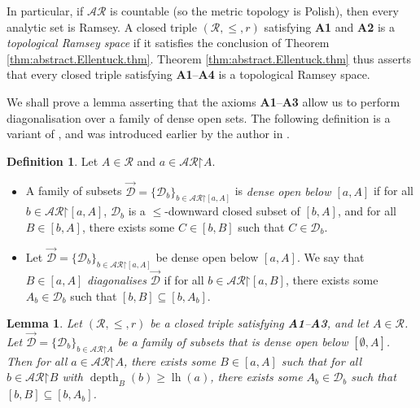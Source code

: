 \documentclass[10pt,a4paper]{amsart}
\theoremstyle{plain}
\numberwithin{equation}{section}
\newtheorem{lemma}[theorem]{Lemma}
\theoremstyle{definition}
\newtheorem{definition}[theorem]{Definition}
\newcommand{\func}{\operatorname}
\newcommand{\cal}{\mathcal}
\newcommand{\restrictedto}{\mathord{\upharpoonright}}
\newcommand{\lh}{\func{lh}}
\newcommand{\depth}{\func{depth}}
\newcommand{\D}{\cal{D}}
\begin{document}
In particular, if $\cal{AR}$ is countable (so the metric topology is Polish), then every analytic set is Ramsey. A closed triple $(\cal{R},\leq,r)$ satisfying \textbf{A1} and \textbf{A2} is a \emph{topological Ramsey space} if it satisfies the conclusion of Theorem \ref{thm:abstract.Ellentuck.thm}. Theorem \ref{thm:abstract.Ellentuck.thm} thus asserts that every closed triple satisfying \textbf{A1}--\textbf{A4} is a topological Ramsey space.

We shall prove a lemma asserting that the axioms \textbf{A1}--\textbf{A3} allow us to perform diagonalisation over a family of dense open sets. The following definition is a variant of \cite[Definition 3.6]{DMN15}, and was introduced earlier by the author in \cite{Y24,Y25}.

\begin{definition}
\label{def:dense.open.diagonalisation}
    Let $A \in \cal{R}$ and $a \in \cal{AR}\restrictedto A$.
    \begin{itemize}
        \item A family of subsets $\vec{\D} = \{\D_b\}_{b \in \cal{AR}\restrictedto[a,A]}$ is \emph{dense open below $[a,A]$} if for all $b \in \cal{AR}\restrictedto[a,A]$, $\D_b$ is a $\leq$-downward closed subset of $[b,A]$, and for all $B \in [b,A]$, there exists some $C \in [b,B]$ such that $C \in \D_b$.
        
        \item Let $\vec{\D} = \{\D_b\}_{b \in \cal{AR}\restrictedto[a,A]}$ be dense open below $[a,A]$. We say that $B \in [a,A]$ \emph{diagonalises} $\vec{\D}$ if for all $b \in \cal{AR}\restrictedto[a,B]$, there exists some $A_b \in \D_b$ such that $[b,B] \subseteq [b,A_b]$.
    \end{itemize}
\end{definition}

\begin{lemma}
\label{lem:R.is.semiselective.improved}
    Let $(\cal{R},\leq,r)$ be a closed triple satisfying \textbf{A1}--\textbf{A3}, and let $A \in \cal{R}$. Let $\vec{\D} = \{\D_b\}_{b\in\cal{AR}\restrictedto A}$ be a family of subsets that is dense open below $[\emptyset,A]$. Then for all $a \in \cal{AR}\restrictedto A$, there exists some $B \in [a,A]$ such that for all $b \in \cal{AR}\restrictedto B$ with $\depth_B(b) \geq \lh(a)$, there exists some $A_b \in \D_b$ such that $[b,B] \subseteq [b,A_b]$.
\end{lemma}
\end{document}
